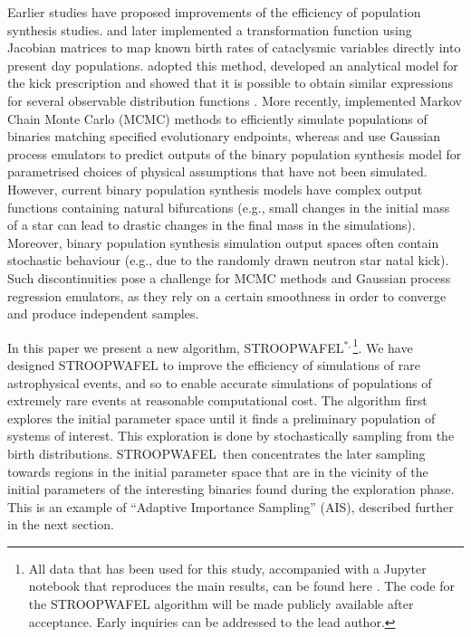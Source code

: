 \documentclass[a4paper,fleqn,usenatbib,useAMS,usedcolumn]{mnras}
\newcommand{\AISs}{\textsc{STROOPWAFEL}}
\begin{document}
Earlier studies have  proposed improvements of the efficiency of population synthesis studies.  \citet{1993A&A...271..149K} and later \citet{1996ApJ...465..338P} implemented a transformation function using Jacobian matrices to map known birth rates of cataclysmic variables directly into present day populations.  \citet{1996ApJ...471..352K} adopted this method, developed an analytical model for the kick prescription and showed that it is possible to obtain similar expressions for several observable distribution functions \citep{1998ApJ...493..351K,2000ApJ...541..319K}. More recently, \citet{andrews2017dart_board} implemented Markov Chain Monte Carlo (MCMC) methods to efficiently simulate populations of binaries matching specified evolutionary endpoints, whereas \citet{2017IAUS..325...46B} and \citet{2018arXiv180608365T} use Gaussian process emulators to predict outputs of the binary population synthesis model for parametrised choices of physical assumptions that have not been simulated.  
However,  current binary population synthesis models have complex output functions containing natural bifurcations (e.g.,  small changes  in the initial mass of a star can lead to drastic changes in the final mass in the simulations). Moreover, binary population synthesis simulation output spaces often contain stochastic behaviour (e.g., due to the randomly drawn neutron star natal kick). Such discontinuities pose a challenge for MCMC methods and Gaussian process regression emulators, as they rely on a certain smoothness in order to converge and produce independent samples.  

In this paper we present a new algorithm, \AISs$^{\ast,}$\footnote{All data that has been used for this study, accompanied with a Jupyter notebook that reproduces the main results, can be found here  \href{https://doi.org/10.5281/zenodo.3387651}{\color{linkcolor}\faBook}. The code for the \AISs{}  algorithm will be made publicly available after acceptance. Early inquiries can be addressed to the lead author.}.  
We have designed \AISs{} to improve the efficiency of simulations of rare astrophysical events, and so to enable accurate simulations of populations of extremely rare events at reasonable computational cost.
The algorithm first explores the initial parameter space until it finds a preliminary population of systems of interest. This exploration is done by stochastically sampling from the birth distributions.    \AISs \ then concentrates the later sampling towards regions in the initial parameter space that are in the vicinity of the initial parameters of the interesting binaries found during the exploration phase. This is an example of ``Adaptive Importance Sampling'' (AIS), described further in the next section.    
\end{document}
